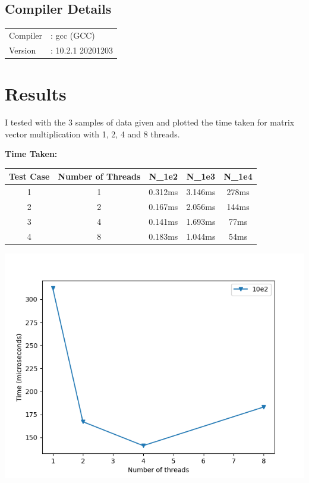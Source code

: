 \documentclass[12pt, letterpaper]{article}
\begin{document}
\subsection{Compiler Details}
\label{sec:compiler}

\begin{tabular}{ll}
  Compiler &: gcc (GCC)\\
  Version  &: 10.2.1 20201203\\
\end{tabular}

\section{Results}
\label{sec:results}

I tested with the 3 samples of data given and plotted the time taken for matrix vector multiplication with 1, 2, 4 and 8 threads.

\textbf{Time Taken:}\\

\begin{tabular}{ |c|c|c|c|c| }
 \hline
 Test Case &Number of Threads &N\_1e2 &N\_1e3 &N\_1e4 \\
 \hline
 1         &1      &0.312ms     &3.146ms         &278ms        \\
 2         &2      &0.167ms     &2.056ms         &144ms        \\
 3         &4      &0.141ms     &1.693ms         &77ms        \\
 4         &8      &0.183ms     &1.044ms        &54ms        \\
 \hline
\end{tabular}

\includegraphics{3}
\end{document}
